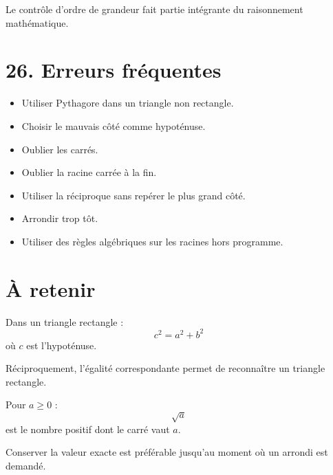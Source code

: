 Le contrôle d'ordre de grandeur fait partie intégrante du raisonnement mathématique.

\section{26. Erreurs fréquentes}

\begin{itemize}
\item Utiliser Pythagore dans un triangle non rectangle.
\item Choisir le mauvais côté comme hypoténuse.
\item Oublier les carrés.
\item Oublier la racine carrée à la fin.
\item Utiliser la réciproque sans repérer le plus grand côté.
\item Arrondir trop tôt.
\item Utiliser des règles algébriques sur les racines hors programme.
\end{itemize}

\section{À retenir}

\begin{aretenir}
Dans un triangle rectangle :
\[
\boxed{c^2=a^2+b^2}
\]
où $c$ est l'hypoténuse.

Réciproquement, l'égalité correspondante permet de reconnaître un triangle rectangle.

Pour $a\ge0$ :
\[
\boxed{\sqrt a}
\]
est le nombre positif dont le carré vaut $a$.

Conserver la valeur exacte est préférable jusqu'au moment où un arrondi est demandé.
\end{aretenir}
